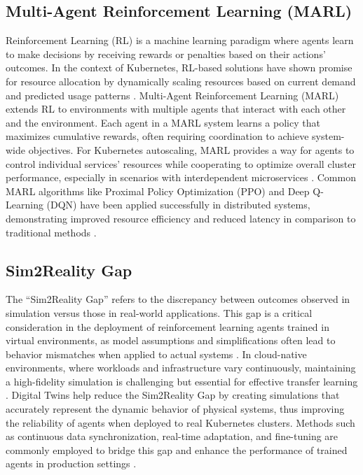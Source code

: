 \documentclass[conference]{IEEEtran}
\begin{document}
\subsection{Multi-Agent Reinforcement Learning (MARL)}
Reinforcement Learning (RL) is a machine learning paradigm where agents learn to make decisions by receiving rewards or penalties based on their actions' outcomes. In the context of Kubernetes, RL-based solutions have shown promise for resource allocation by dynamically scaling resources based on current demand and predicted usage patterns \cite{li_rl_resource_allocation}. Multi-Agent Reinforcement Learning (MARL) extends RL to environments with multiple agents that interact with each other and the environment. Each agent in a MARL system learns a policy that maximizes cumulative rewards, often requiring coordination to achieve system-wide objectives. For Kubernetes autoscaling, MARL provides a way for agents to control individual services' resources while cooperating to optimize overall cluster performance, especially in scenarios with interdependent microservices \cite{zhang_marl_k8s}. Common MARL algorithms like Proximal Policy Optimization (PPO) and Deep Q-Learning (DQN) have been applied successfully in distributed systems, demonstrating improved resource efficiency and reduced latency in comparison to traditional methods \cite{schwartz_drl_cloud}.

\subsection{Sim2Reality Gap}
The ``Sim2Reality Gap'' refers to the discrepancy between outcomes observed in simulation versus those in real-world applications. This gap is a critical consideration in the deployment of reinforcement learning agents trained in virtual environments, as model assumptions and simplifications often lead to behavior mismatches when applied to actual systems \cite{nguyen_sim2reality}. In cloud-native environments, where workloads and infrastructure vary continuously, maintaining a high-fidelity simulation is challenging but essential for effective transfer learning \cite{tan_nn_resource_approx}. Digital Twins help reduce the Sim2Reality Gap by creating simulations that accurately represent the dynamic behavior of physical systems, thus improving the reliability of agents when deployed to real Kubernetes clusters. Methods such as continuous data synchronization, real-time adaptation, and fine-tuning are commonly employed to bridge this gap and enhance the performance of trained agents in production settings \cite{wu_multi_objective_rl}.
\end{document}
